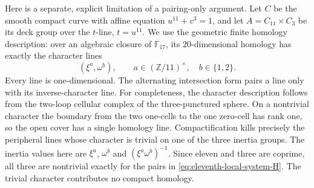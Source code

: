 Here is a separate, explicit limitation of a pairing-only argument.
Let $C$ be the smooth compact curve with affine equation
$u^{11}+v^3=1$, and let
$A=C_{11}\times C_3$ be its deck group over the $t$-line,
$t=u^{11}$.  We use the geometric finite homology description:
over an algebraic closure of $\mathbb F_{17}$, its $20$-dimensional
homology has exactly the character lines
\begin{equation}\label{eq:eleventh-local-system-H}
(\xi^a,\omega^b),\qquad
 a\in(\mathbb Z/11)^\times,\quad b\in\{1,2\}.
\end{equation}
Every line is one-dimensional.  The alternating intersection form
pairs a line only with its inverse-character line.
For completeness, the character description follows from the
two-loop cellular complex of the three-punctured sphere.  On a
nontrivial character the boundary from the two one-cells to the
one zero-cell has rank one, so the open cover has a single
homology line.  Compactification kills precisely the peripheral
lines whose character is trivial on one of the three inertia
groups.  The inertia values here are $\xi^a$, $\omega^b$ and
$(\xi^a\omega^b)^{-1}$.  Since eleven and three are coprime,
all three are nontrivial exactly for the pairs in \eqref{eq:eleventh-local-system-H}.
The trivial character contributes no compact homology.

